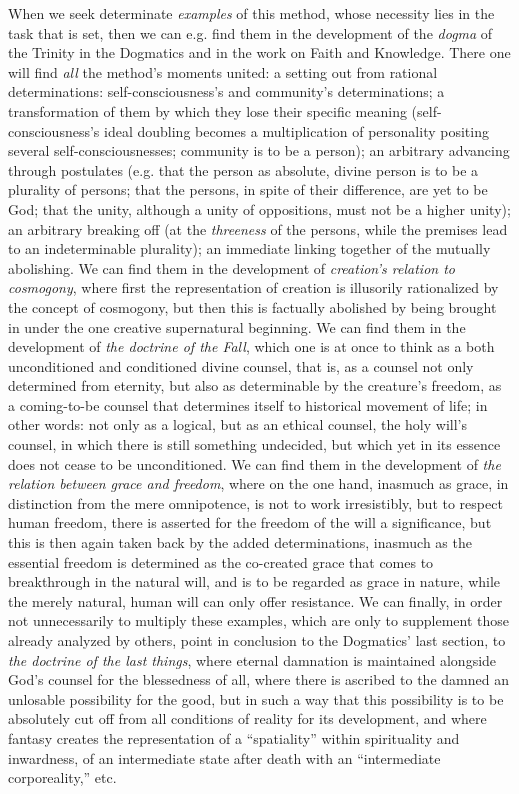 \documentclass[12pt,a4paper]{book}
\begin{document}
When we seek determinate \emph{examples} of this method, whose necessity lies in the task that
is set, then we can e.g. find them in the development of the \emph{dogma} of the Trinity in the
Dogmatics and in the work on Faith and Knowledge. There one will find \emph{all} the method's
moments united: a setting out from rational determinations: self-consciousness's and
community's determinations; a transformation of them by which they lose their specific
meaning (self-consciousness's ideal doubling becomes a multiplication of personality
positing several self-consciousnesses; community is to be a person); an arbitrary
advancing through postulates (e.g. that the person as absolute, divine person is to be a
plurality of persons; that the persons, in spite of their difference, are yet to be God;
that the unity, although a unity of oppositions, must not be a higher unity); an arbitrary
breaking off (at the \emph{threeness} of the persons, while the premises lead to an indeterminable
plurality); an immediate linking together of the mutually abolishing. We can find
them in the development of \emph{creation's relation to cosmogony}, where first the representation
of creation is illusorily rationalized by the concept of cosmogony, but then this is
factually abolished by being brought in under the one creative supernatural beginning.
We can find them in the development of \emph{the doctrine of the Fall}, which one is at once
to think as a both unconditioned and conditioned divine counsel, that is, as a counsel not
only determined from eternity, but also as determinable by the creature's freedom, as a
coming-to-be counsel that determines itself to historical movement of life; in other words:
not only as a logical, but as an ethical counsel, the holy will's counsel, in which there is
still something undecided, but which yet in its essence does not cease to be unconditioned.
We can find them in the development of \emph{the relation between grace and freedom}, where
on the one hand, inasmuch as grace, in distinction from the mere omnipotence, is not to work
irresistibly, but to respect human freedom, there is asserted for the freedom of the will a
significance, but this is then again taken back by the added determinations, inasmuch as the
essential freedom is determined as the co-created grace that comes to breakthrough in the
natural will, and is to be regarded as grace in nature, while the merely natural, human will
can only offer resistance. We can finally, in order not unnecessarily to multiply these
examples, which are only to supplement those already analyzed by others, point in conclusion
to the Dogmatics' last section, to \emph{the doctrine of the last things}, where eternal
damnation is maintained alongside God's counsel for the blessedness of all, where there is
ascribed to the damned an unlosable possibility for the good, but in such a way that this
possibility is to be absolutely cut off from all conditions of reality for its development,
and where fantasy creates the representation of a ``spatiality'' within spirituality and
inwardness, of an intermediate state after death with an ``intermediate corporeality,'' etc.
\end{document}
